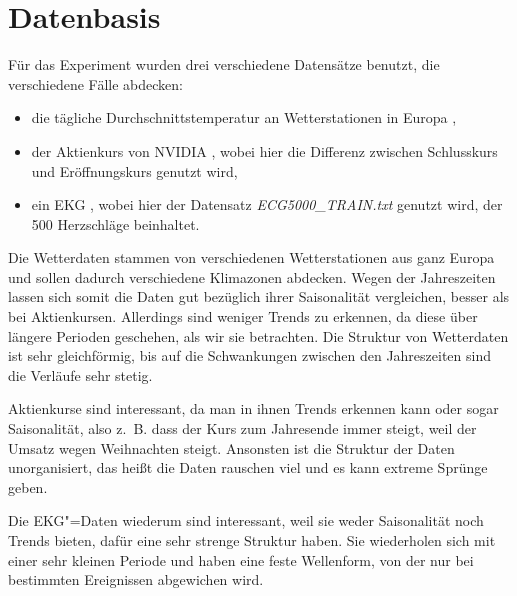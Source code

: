 \section{Datenbasis}
Für das Experiment wurden drei verschiedene Datensätze benutzt, die verschiedene Fälle abdecken: 
\begin{itemize}
    \item die tägliche Durchschnittstemperatur an Wetterstationen in Europa \cite{ecadWetterdaten},
    \item der Aktienkurs von NVIDIA \cite{nvidiaStock}, wobei hier die Differenz zwischen Schlusskurs und Eröffnungskurs genutzt wird,
    \item ein EKG \cite{ecg500}, wobei hier der Datensatz \textit{ECG5000\_TRAIN.txt} genutzt wird, der 500 Herzschläge beinhaltet.
\end{itemize}

Die Wetterdaten stammen von verschiedenen Wetterstationen aus ganz Europa und sollen dadurch verschiedene Klimazonen abdecken. Wegen der Jahreszeiten lassen sich somit die Daten gut bezüglich ihrer Saisonalität vergleichen, besser als bei Aktienkursen. Allerdings sind weniger Trends zu erkennen, da diese über längere Perioden geschehen, als wir sie betrachten. Die Struktur von Wetterdaten ist sehr gleichförmig, bis auf die Schwankungen zwischen den Jahreszeiten sind die Verläufe sehr stetig.

Aktienkurse sind interessant, da man in ihnen Trends erkennen kann oder sogar Saisonalität, also z.~B. dass der Kurs zum Jahresende immer steigt, weil der Umsatz wegen Weihnachten steigt. Ansonsten ist die Struktur der Daten unorganisiert, das heißt die Daten rauschen viel und es kann extreme Sprünge geben.

Die EKG"=Daten wiederum sind interessant, weil sie weder Saisonalität noch Trends bieten, dafür eine sehr strenge Struktur haben. Sie wiederholen sich mit einer sehr kleinen Periode und haben eine feste Wellenform, von der nur bei bestimmten Ereignissen abgewichen wird.